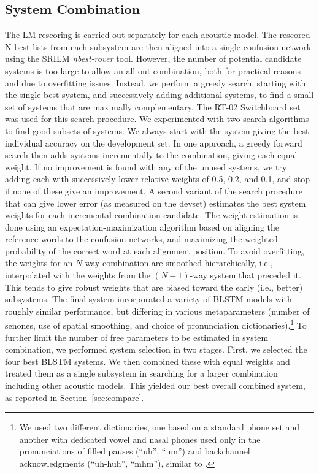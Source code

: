 \documentclass{article}
\begin{document}
\subsection{System Combination}
	\label{sec:combination}
The LM rescoring is carried out separately for each acoustic model.
The rescored N-best lists from each subsystem are then aligned into a single confusion 
network \cite{sri-2000} using the SRILM {\em nbest-rover} tool.
However, the number of potential candidate systems is too large to allow an all-out combination,
both for practical reasons and due to overfitting issues.
Instead, we perform a greedy search, starting with the single best system, and 
successively adding additional systems,
to find a small set of systems that are maximally complementary.
The RT-02 Switchboard set was used for this search procedure.
We experimented with two search algorithms to find good subsets of systems.
We always start with the system giving the best individual accuracy on the development set.
In one approach, a greedy forward search then adds systems incrementally to the combination, giving each equal
weight.  If no improvement is found with any of the unused systems, we try adding each with successively
lower relative weights of 0.5, 0.2, and 0.1, and stop if none of these give an improvement.
A second variant of the search procedure that can give lower error (as measured on the devset)
estimates the best system weights for each incremental combination candidate.
The weight estimation is done using an expectation-maximization algorithm based on aligning the reference words 
to the confusion networks, and maximizing the weighted probability of the correct word at each alignment position.
To avoid overfitting, the weights for an $N$-way combination are smoothed hierarchically, i.e., interpolated with the
weights from the $(N-1)$-way system that preceded it.
This tends to give robust weights that are biased toward the early (i.e., better) subsystems.
The final system incorporated a variety of BLSTM models with roughly similar performance,
but differing in various metaparameters
(number of senones, use of spatial smoothing, and choice of pronunciation dictionaries).\footnote{We used two different dictionaries, one based on a standard phone set and another with
dedicated vowel and nasal phones used only in the pronunciations of filled pauses (``uh'', ``um'')
and backchannel acknowledgments (``uh-huh'', ``mhm''), similar to \cite{sri-2000}.}
To further limit the number of free parameters to be estimated in system combination, we performed system selection
in two stages.  First, we selected the four best BLSTM systems.
We then combined these with equal weights and treated them as a single subsystem in searching for
a larger combination including other acoustic models.
This yielded our best overall combined system, as reported in Section~\ref{sec:compare}.
\end{document}
